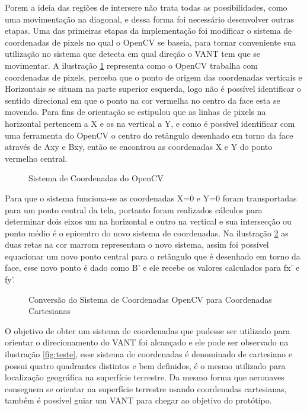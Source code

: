 Porem a ideia das regiões de intersere não trata todas as possibilidades, como uma movimentação na diagonal, e dessa forma foi necessário desenvolver outras etapas. Uma das primeiras etapas da implementação foi modificar o sistema de coordenadas de pixels no qual o OpenCV se baseia, para tornar conveniente sua utilização no sistema que detecta em qual direção o VANT tem que se movimentar. A ilustração \ref{fig:quad1} representa como o OpenCV trabalha com coordenadas de pixels, perceba que o ponto de origem das coordenadas verticais e Horizontais se situam na parte superior esquerda, logo não é possível identificar o sentido direcional em que o ponto na cor vermelha no centro da face esta se movendo. Para fins de orientação se estipulou que as linhas de pixels na horizontal pertencem a X e os na vertical a Y, e como é possível identificar com uma ferramenta do OpenCV o centro do retângulo desenhado em torno da face através de Axy e Bxy, então se encontrou as coordenadas X e Y do ponto vermelho central.

\begin{figure}[H]
	\centering
	\caption{Sistema de Coordenadas do OpenCV}
	
	\label{fig:quad1}
\end{figure}

Para que o sistema funciona-se as coordenadas X=0 e Y=0 foram transportadas para um ponto central da tela, portanto foram realizados cálculos para determinar dois eixos um na horizontal e outro na vertical e sua intersecção ou ponto médio é o epicentro do novo sistema de coordenadas. Na ilustração \ref{fig:quad2} as duas retas na cor marrom representam o novo sistema, assim foi possível equacionar um novo ponto central para o retângulo que é  desenhado em torno da face, esse novo ponto é dado como B' e ele recebe os valores calculados para fx' e fy'.   

\begin{figure}[H]
	\centering
	\caption{Conversão do Sistema de Coordenadas OpenCV para Coordenadas Cartesianas}
	
	\label{fig:quad2}
\end{figure}

O objetivo de obter um sistema de coordenadas que pudesse ser utilizado para orientar o direcionamento do VANT foi alcançado e ele pode ser observado na ilustração \ref{fig:teste}, esse sistema de coordenadas é denominado de cartesiano e possui quatro quadrantes distintos e bem definidos, é o mesmo utilizado para localização geográfica na superfície terrestre. Da mesmo forma que aeronaves conseguem se orientar na superfície terrestre usando coordenadas cartesianas, também é possível guiar um VANT para chegar ao objetivo do protótipo.

